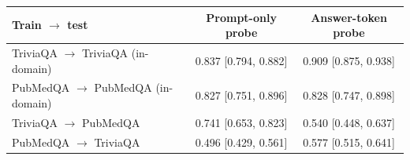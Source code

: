 \begin{tabular}{lcc}
\toprule
Train $\to$ test & Prompt-only probe & Answer-token probe \\
\midrule
TriviaQA $\to$ TriviaQA (in-domain) & 0.837 [0.794, 0.882] & 0.909 [0.875, 0.938] \\
PubMedQA $\to$ PubMedQA (in-domain) & 0.827 [0.751, 0.896] & 0.828 [0.747, 0.898] \\
TriviaQA $\to$ PubMedQA & 0.741 [0.653, 0.823] & 0.540 [0.448, 0.637] \\
PubMedQA $\to$ TriviaQA & 0.496 [0.429, 0.561] & 0.577 [0.515, 0.641] \\
\bottomrule
\end{tabular}
